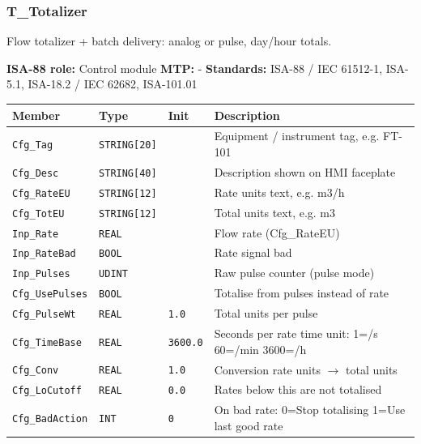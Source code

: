 \subsubsection*{T\_Totalizer}
\label{app:pclib:ttotalizer}
Flow totalizer + batch delivery: analog or pulse, day/\allowbreak{}hour totals.

{\small\textbf{ISA-88 role:} Control module \quad \textbf{MTP:} - \quad \textbf{Standards:} ISA-88 /\allowbreak{} IEC 61512-1, ISA-5.1, ISA-18.2 /\allowbreak{} IEC 62682, ISA-101.01}
{\footnotesize
\begin{longtable}{@{}>{\raggedright\arraybackslash}p{3.4cm}>{\raggedright\arraybackslash}p{3.3cm}>{\raggedright\arraybackslash}p{1.3cm}>{\raggedright\arraybackslash}p{6.4cm}@{}}
\toprule
\rowcolor{tblhead}\textbf{Member} & \textbf{Type} & \textbf{Init} & \textbf{Description} \\
\midrule
\endhead
\texttt{Cfg\_Tag} & \texttt{STRING[20]} &  & Equipment /\allowbreak{} instrument tag, e.g. FT-101 \\
\texttt{Cfg\_Desc} & \texttt{STRING[40]} &  & Description shown on HMI faceplate \\
\texttt{Cfg\_RateEU} & \texttt{STRING[12]} &  & Rate units text, e.g. m3/\allowbreak{}h \\
\texttt{Cfg\_TotEU} & \texttt{STRING[12]} &  & Total units text, e.g. m3 \\
\texttt{Inp\_Rate} & \texttt{REAL} &  & Flow rate (Cfg\_RateEU) \\
\texttt{Inp\_RateBad} & \texttt{BOOL} &  & Rate signal bad \\
\texttt{Inp\_Pulses} & \texttt{UDINT} &  & Raw pulse counter (pulse mode) \\
\texttt{Cfg\_UsePulses} & \texttt{BOOL} &  & Totalise from pulses instead of rate \\
\texttt{Cfg\_PulseWt} & \texttt{REAL} & \texttt{1.0} & Total units per pulse \\
\texttt{Cfg\_TimeBase} & \texttt{REAL} & \texttt{3600.0} & Seconds per rate time unit: 1=/\allowbreak{}s 60=/\allowbreak{}min 3600=/\allowbreak{}h \\
\texttt{Cfg\_Conv} & \texttt{REAL} & \texttt{1.0} & Conversion rate units $\rightarrow$ total units \\
\texttt{Cfg\_LoCutoff} & \texttt{REAL} & \texttt{0.0} & Rates below this are not totalised \\
\texttt{Cfg\_BadAction} & \texttt{INT} & \texttt{0} & On bad rate: 0=Stop totalising 1=Use last good rate \\

\end{longtable}}
